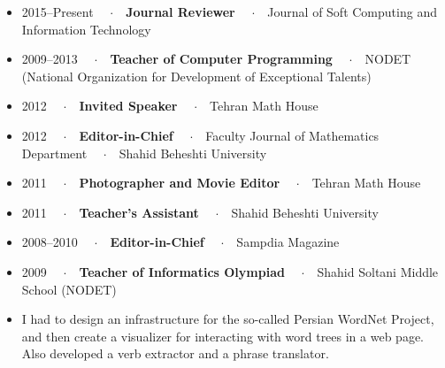 \documentclass[10pt,a4paper]{altacv}
\newcommand{\sep}{\ \ $\cdot$\ \ }
\begin{document}
\clearpage



             


\begin{itemize}
\item 2015--Present \sep \textbf{Journal Reviewer} \sep Journal of Soft Computing and Information Technology
\item 2009--2013 \sep \textbf{Teacher of Computer Programming} \sep NODET (National Organization for Development of Exceptional Talents)
\item 2012 \sep \textbf{Invited Speaker} \sep Tehran Math House
\item 2012 \sep \textbf{Editor-in-Chief} \sep Faculty Journal of Mathematics Department \sep Shahid Beheshti University
\item 2011 \sep \textbf{Photographer and Movie Editor} \sep Tehran Math House
\item 2011 \sep \textbf{Teacher's Assistant} \sep Shahid Beheshti University
\item 2008--2010 \sep \textbf{Editor-in-Chief} \sep Sampdia Magazine
\item 2009 \sep \textbf{Teacher of Informatics Olympiad} \sep Shahid Soltani Middle School (NODET)
\end{itemize}

\medskip




\begin{itemize}
\item I had to design an infrastructure for the so-called Persian WordNet Project, and then create a visualizer for interacting with word trees in a web page. Also developed a verb extractor and a phrase translator.
\end{itemize}
        
\end{document}
